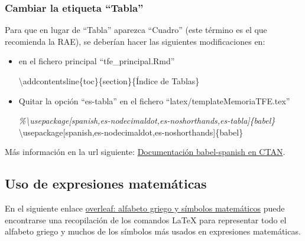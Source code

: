 \documentclass[12pt,a4paper,oneside,]{article}
\newenvironment{Shaded}{\begin{snugshade}}{\end{snugshade}}
\newcommand{\BuiltInTok}[1]{#1}
\newcommand{\CommentTok}[1]{\textcolor[rgb]{0.56,0.35,0.01}{\textit{#1}}}
\newcommand{\ExtensionTok}[1]{#1}
\newcommand{\FunctionTok}[1]{\textcolor[rgb]{0.00,0.00,0.00}{#1}}
\newcommand{\NormalTok}[1]{#1}
\numberwithin{dummy}{section}
\theoremstyle{ocrenumbox}
\theoremstyle{blacknumex}
\theoremstyle{blacknumbox}
\theoremstyle{ocrenum}
\theoremstyle{ocrenum}
\begin{document}
\hypertarget{cambiar-la-etiqueta-tabla}{%
\subsubsection{Cambiar la etiqueta
``Tabla''}\label{cambiar-la-etiqueta-tabla}}

Para que en lugar de ``Tabla'' aparezca ``Cuadro'' (este término es el
que recomienda la RAE), se deberían hacer las siguientes modificaciones
en:

\begin{itemize}
\item
  en el fichero principal ``tfe\_principal.Rmd''

\begin{Shaded}
\begin{Highlighting}[]
\FunctionTok{\textbackslash{}addcontentsline}\NormalTok{\{toc\}\{section\}\{Índice de Tablas\}}
\end{Highlighting}
\end{Shaded}
\item
  Quitar la opción ``es-tabla'' en el fichero
  ``latex/templateMemoriaTFE.tex''

\begin{Shaded}
\begin{Highlighting}[]
\CommentTok{\%\textbackslash{}usepackage[spanish,es{-}nodecimaldot,es{-}noshorthands,es{-}tabla]\{babel\}}
\BuiltInTok{\textbackslash{}usepackage}\NormalTok{[spanish,es{-}nodecimaldot,es{-}noshorthands]\{}\ExtensionTok{babel}\NormalTok{\}}
\end{Highlighting}
\end{Shaded}
\end{itemize}

Más información en la url siguiente:
\href{https://osl.ugr.es/CTAN/macros/latex/contrib/babel-contrib/spanish/spanish.pdf}{Documentación
babel-spanish en CTAN}.

\hypertarget{uso-de-expresiones-matemuxe1ticas}{%
\subsection{Uso de expresiones
matemáticas}\label{uso-de-expresiones-matemuxe1ticas}}

En el siguiente enlace
\href{https://www.overleaf.com/learn/latex/List_of_Greek_letters_and_math_symbols}{overleaf:
alfabeto griego y símbolos matemáticos} puede encontrarse una
recopilación de los comandos LaTeX para representar todo el alfabeto
griego y muchos de los símbolos más usados en expresiones matemáticas.
\end{document}
